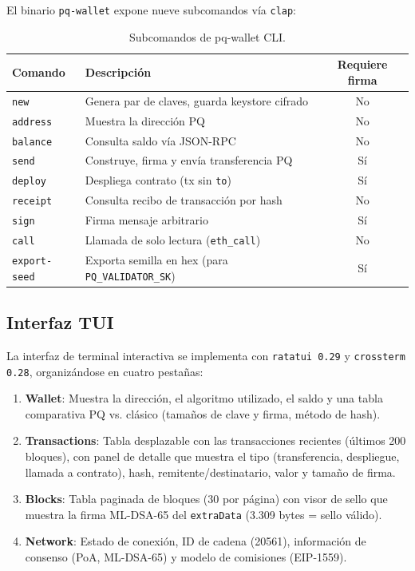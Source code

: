 El binario \texttt{pq-wallet} expone nueve subcomandos vía \texttt{clap}:

\begin{table}[htbp]
\centering
\caption{Subcomandos de pq-wallet CLI.}
\label{tab:cli_commands}
\begin{tabular}{@{}llc@{}}
\toprule
\textbf{Comando} & \textbf{Descripción} & \textbf{Requiere firma} \\
\midrule
\texttt{new} & Genera par de claves, guarda keystore cifrado & No \\
\texttt{address} & Muestra la dirección PQ & No \\
\texttt{balance} & Consulta saldo vía JSON-RPC & No \\
\texttt{send} & Construye, firma y envía transferencia PQ & Sí \\
\texttt{deploy} & Despliega contrato (tx sin \texttt{to}) & Sí \\
\texttt{receipt} & Consulta recibo de transacción por hash & No \\
\texttt{sign} & Firma mensaje arbitrario & Sí \\
\texttt{call} & Llamada de solo lectura (\texttt{eth\_call}) & No \\
\texttt{export-seed} & Exporta semilla en hex (para \texttt{PQ\_VALIDATOR\_SK}) & Sí \\
\bottomrule
\end{tabular}
\end{table}

\subsection{Interfaz TUI}

La interfaz de terminal interactiva se implementa con \texttt{ratatui 0.29} y \texttt{crossterm 0.28}, organizándose en cuatro pestañas:

\begin{enumerate}
  \item \textbf{Wallet}: Muestra la dirección, el algoritmo utilizado, el saldo y una tabla comparativa PQ vs. clásico (tamaños de clave y firma, método de hash).
  
  \item \textbf{Transactions}: Tabla desplazable con las transacciones recientes (últimos 200 bloques), con panel de detalle que muestra el tipo (transferencia, despliegue, llamada a contrato), hash, remitente/destinatario, valor y tamaño de firma.
  
  \item \textbf{Blocks}: Tabla paginada de bloques (30 por página) con visor de sello que muestra la firma ML-DSA-65 del \texttt{extraData} (3.309 bytes = sello válido).
  
  \item \textbf{Network}: Estado de conexión, ID de cadena (20561), información de consenso (PoA, ML-DSA-65) y modelo de comisiones (EIP-1559).
\end{enumerate}

